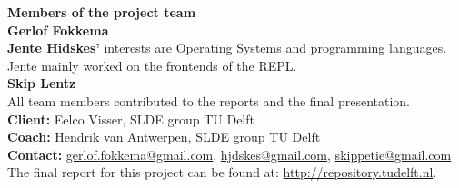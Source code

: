 \noindent\textbf{Members of the project team}\\
\textbf{Gerlof Fokkema}\\
\textbf{Jente Hidskes' }interests are Operating Systems and programming
languages. Jente mainly worked on the frontends of the REPL.\\
\textbf{Skip Lentz}\\

\noindent All team members contributed to the reports and the final
presentation.\\

\noindent\textbf{Client:} Eelco Visser, SLDE group TU Delft\\
\textbf{Coach:} Hendrik van Antwerpen, SLDE group TU Delft\\
\textbf{Contact:}
\href{mailto:gerlof.fokkema@gmail.com}{gerlof.fokkema@gmail.com},
\href{mailto:hjdskes@gmail.com}{hjdskes@gmail.com},
\href{mailto:skippetie@gmail.com}{skippetie@gmail.com}\\

\noindent The final report for this project can be found at: \url{http://repository.tudelft.nl}.

